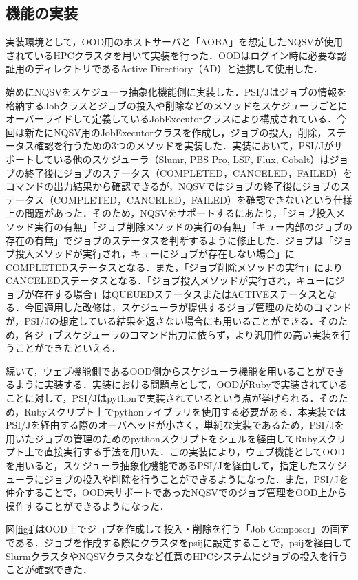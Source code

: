 \documentclass[a4paper,oneside,twocolumn,notitlepage,dvipdfmx]{jsarticle}
\begin{document}
\subsection{機能の実装}
実装環境として，OOD用のホストサーバと「AOBA」を想定したNQSVが使用されているHPCクラスタを用いて実装を行った．OODはログイン時に必要な認証用のディレクトリであるActive Directiory（AD）と連携して使用した．\par
始めにNQSVをスケジューラ抽象化機能側に実装した．PSI/Jはジョブの情報を格納するJobクラスとジョブの投入や削除などのメソッドをスケジューラごとにオーバーライドして定義しているJobExecutorクラスにより構成されている．今回は新たにNQSV用のJobExecutorクラスを作成し，ジョブの投入，削除，ステータス確認を行うための3つのメソッドを実装した．実装において，PSI/Jがサポートしている他のスケジューラ（Slumr, PBS Pro, LSF, Flux, Cobalt）はジョブの終了後にジョブのステータス（COMPLETED，CANCELED，FAILED）をコマンドの出力結果から確認できるが，NQSVではジョブの終了後にジョブのステータス（COMPLETED，CANCELED，FAILED）を確認できないという仕様上の問題があった．そのため，NQSVをサポートするにあたり，「ジョブ投入メソッド実行の有無」「ジョブ削除メソッドの実行の有無」「キュー内部のジョブの存在の有無」でジョブのステータスを判断するように修正した．ジョブは「ジョブ投入メソッドが実行され，キューにジョブが存在しない場合」にCOMPLETEDステータスとなる．また，「ジョブ削除メソッドの実行」によりCANCELEDステータスとなる．「ジョブ投入メソッドが実行され，キューにジョブが存在する場合」はQUEUEDステータスまたはACTIVEステータスとなる．今回適用した改修は，スケジューラが提供するジョブ管理のためのコマンドが，PSI/Jの想定している結果を返さない場合にも用いることができる．そのため，各ジョブスケジューラのコマンド出力に依らず，より汎用性の高い実装を行うことができたといえる．\par
続いて，ウェブ機能側であるOOD側からスケジューラ機能を用いることができるように実装する．実装における問題点として，OODがRubyで実装されていることに対して，PSI/Jはpythonで実装されているという点が挙げられる．そのため，Rubyスクリプト上でpythonライブラリを使用する必要がある．本実装ではPSI/Jを経由する際のオーバヘッドが小さく，単純な実装であるため，PSI/Jを用いたジョブの管理のためのpythonスクリプトをシェルを経由してRubyスクリプト上で直接実行する手法を用いた．この実装により，ウェブ機能としてOODを用いると，スケジューラ抽象化機能であるPSI/Jを経由して，指定したスケジューラにジョブの投入や削除を行うことができるようになった．また，PSI/Jを仲介することで，OOD未サポートであったNQSVでのジョブ管理をOOD上から操作することができるようになった．\par
図\ref{fig4}はOOD上でジョブを作成して投入・削除を行う「Job Composer」の画面である．ジョブを作成する際にクラスタをpsijに設定することで，psijを経由してSlurmクラスタやNQSVクラスタなど任意のHPCシステムにジョブの投入を行うことが確認できた．\par
\end{document}
